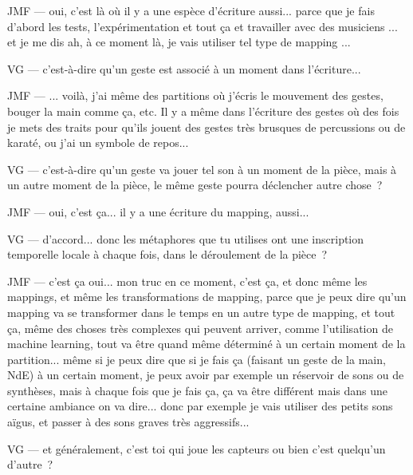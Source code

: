 JMF — oui, c'est là où il y a une espèce d'écriture aussi... parce que je fais d'abord les tests, l'expérimentation et tout ça et travailler avec des musiciens ... et je me dis ah, à ce moment là, je vais utiliser tel type de mapping ... 

VG — c'est-à-dire qu'un geste est associé à un moment dans l'écriture... 

JMF — ... voilà, j'ai même des partitions où j'écris le mouvement des gestes, bouger la main comme ça, etc. Il y a même dans l'écriture des gestes où des fois je mets des traits pour qu'ils jouent des gestes très brusques de percussions ou de karaté, ou j'ai un symbole de repos... 

VG — c'est-à-dire qu'un geste va jouer tel son à un moment de la pièce, mais à un autre moment de la pièce, le même geste pourra déclencher autre chose ? 

JMF — oui, c'est ça... il y a une écriture du mapping, aussi... 

VG — d'accord... donc les métaphores que tu utilises ont une inscription temporelle locale à chaque fois, dans le déroulement de la pièce ? 

JMF — c'est ça oui... mon truc en ce moment, c'est ça, et donc même les mappings, et même les transformations de mapping, parce que je peux dire qu'un mapping va se transformer dans le temps en un autre type de mapping, et tout ça, même des choses très complexes qui peuvent arriver, comme l'utilisation de machine learning, tout va être quand même déterminé à un certain moment de la partition... même si je peux dire que si je fais ça (faisant un geste de la main, NdE) à un certain moment, je peux avoir par exemple un réservoir de sons ou de synthèses, mais à chaque fois que je fais ça, ça va être différent mais dans une certaine ambiance on va dire... donc par exemple je vais utiliser des petits sons aïgus, et passer à des sons graves très aggressifs... 

VG — et généralement, c'est toi qui joue les capteurs ou bien c'est quelqu'un d'autre ? 

